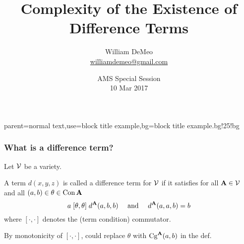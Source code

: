 \documentclass[12pt,xcolor=dvipsnames%
   ]{beamer}
\begin{document}
\title[Existence of Difference Terms]{Complexity of the Existence of Difference Terms}
\author[\url{williamdemeo@gmail.com}]{William DeMeo\\
{\small \url{williamdemeo@gmail.com}}}

\date[10 Mar 2017]{AMS Special Session\\[10pt]
10 Mar 2017}

\frame[plain]{\titlepage}

%
{parent=normal text,use=block title example,bg=block title example.bg!25!bg}

\begin{frame}
\frametitle{What is a difference term?}
Let $\mathcal{V}$ be a variety. 

A term $d(x,y,z)$ is called a \alert{difference term} for $\mathcal{V}$ 
if it satisfies for all $\mathbf{A} \in \mathcal{V}$ and all $(a,b) \in \theta\in \operatorname{Con}\mathbf{A}$
\begin{equation}
\label{eq:3}  
a \mathrel{[\theta, \theta]} d^{\mathbf{A}}(a,b,b) 
\quad \text{ and } \quad
d^{\mathbf{A}}(a,a,b) = b 
\end{equation}
where $[\cdot, \cdot]$ denotes the (term condition) commutator.

\pause

By monotonicity of $[\cdot, \cdot]$, could replace $\theta$ 
with $\operatorname{Cg}^{\mathbf{A}}(a,b)$ in the def.


\end{frame}
\end{document}
